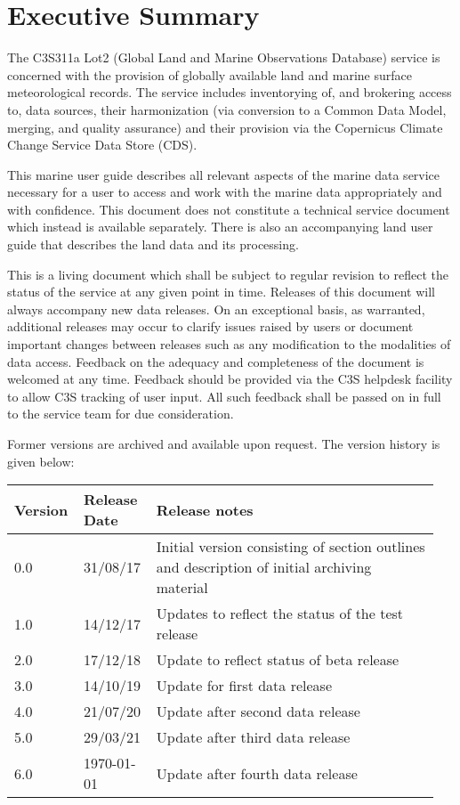 \section*{Executive Summary}

The C3S311a Lot2 (Global Land and Marine Observations Database) service is concerned with the provision of globally available land and marine surface meteorological records. 
The service includes inventorying of, and brokering access to, data sources, their harmonization (via conversion to a Common Data Model, merging, and quality assurance) and their provision via the Copernicus Climate Change Service Data Store (CDS).

This marine user guide describes all relevant aspects of the marine data service necessary for a user to access and work with the marine data appropriately and with confidence. 
This document does not constitute a technical service document which instead is available separately. 
There is also an accompanying land user guide that describes the land data and its processing.

This is a living document which shall be subject to regular revision to reflect the status of the service at any given point in time. Releases of this document will always accompany new data releases. On an exceptional basis, as warranted, additional releases may occur to clarify issues raised by users or document important changes between releases such as any modification to the modalities of data access. Feedback on the adequacy and completeness of the document is welcomed at any time. Feedback should be provided via the C3S helpdesk facility to allow C3S tracking of user input. All such feedback shall be passed on in full to the service team for due consideration.

Former versions are archived and available upon request. The version history is given below:

\begin{table}[h]
\begin{tabular}{|p{0.15\linewidth}|p{0.15\linewidth}|p{0.65\linewidth}|}
\hline
\bfseries Version & \bfseries Release Date & \bfseries Release notes \\\hline
0.0	& 31/08/17	& Initial version consisting of section outlines and description of initial archiving material \\\hline
1.0	& 14/12/17	& Updates to reflect the status of the test release \\\hline
2.0	& 17/12/18	& Update to reflect status of beta release \\\hline
3.0	& 14/10/19	& Update for first data release \\\hline
4.0	& 21/07/20	& Update after second data release \\\hline
5.0 & 29/03/21  & Update after third data release \\\hline
6.0 & \today    & Update after fourth data release \\\hline
\end{tabular}
\end{table}
\FloatBarrier

